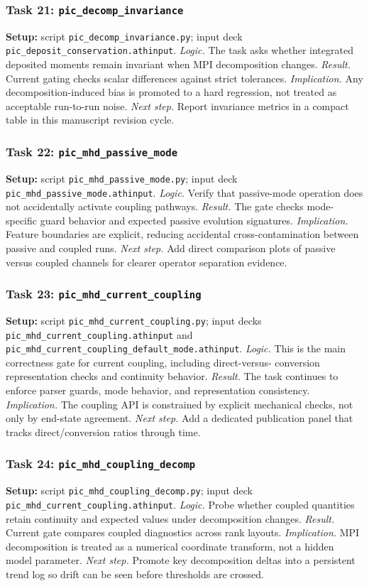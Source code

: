 \documentclass[twocolumn]{aastex701}
\newcommand{\logic}[1]{\textit{Logic.} #1}
\newcommand{\result}[1]{\textit{Result.} #1}
\newcommand{\implication}[1]{\textit{Implication.} #1}
\newcommand{\nextstep}[1]{\textit{Next step.} #1}
\begin{document}
\subsubsection*{Task 21: \texttt{pic\_decomp\_invariance}}
\textbf{Setup:} script \texttt{pic\_decomp\_invariance.py}; input deck
\texttt{pic\_deposit\_conservation.athinput}. \logic{The task asks whether
integrated deposited moments remain invariant when MPI decomposition changes.}
\result{Current gating checks scalar differences against strict tolerances.}
\implication{Any decomposition-induced bias is promoted to a hard regression,
not treated as acceptable run-to-run noise.} \nextstep{Report invariance
metrics in a compact table in this manuscript revision cycle.}

\subsubsection*{Task 22: \texttt{pic\_mhd\_passive\_mode}}
\textbf{Setup:} script \texttt{pic\_mhd\_passive\_mode.py}; input deck
\texttt{pic\_mhd\_passive\_mode.athinput}. \logic{Verify that passive-mode
operation does not accidentally activate coupling pathways.} \result{The gate
checks mode-specific guard behavior and expected passive evolution signatures.}
\implication{Feature boundaries are explicit, reducing accidental
cross-contamination between passive and coupled runs.} \nextstep{Add direct
comparison plots of passive versus coupled channels for clearer operator
separation evidence.}

\subsubsection*{Task 23: \texttt{pic\_mhd\_current\_coupling}}
\textbf{Setup:} script \texttt{pic\_mhd\_current\_coupling.py}; input decks
\texttt{pic\_mhd\_current\_coupling.athinput} and
\texttt{pic\_mhd\_current\_coupling\_default\_mode.athinput}. \logic{This is
the main correctness gate for current coupling, including direct-versus-
conversion representation checks and continuity behavior.} \result{The task
continues to enforce parser guards, mode behavior, and representation
consistency.} \implication{The coupling API is constrained by explicit
mechanical checks, not only by end-state agreement.} \nextstep{Add a dedicated
publication panel that tracks direct/conversion ratios through time.}

\subsubsection*{Task 24: \texttt{pic\_mhd\_coupling\_decomp}}
\textbf{Setup:} script \texttt{pic\_mhd\_coupling\_decomp.py}; input deck
\texttt{pic\_mhd\_current\_coupling.athinput}. \logic{Probe whether coupled
quantities retain continuity and expected values under decomposition changes.}
\result{Current gate compares coupled diagnostics across rank layouts.}
\implication{MPI decomposition is treated as a numerical coordinate transform,
not a hidden model parameter.} \nextstep{Promote key decomposition deltas into a
persistent trend log so drift can be seen before thresholds are crossed.}
\end{document}
